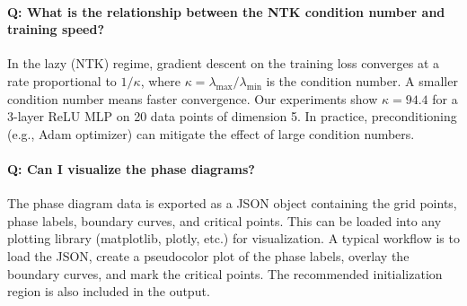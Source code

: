 \documentclass[10pt]{article}
\theoremstyle{definition}
\begin{document}
\paragraph{Q: What is the relationship between the NTK condition number and training speed?}
In the lazy (NTK) regime, gradient descent on the training loss converges at a rate proportional to $1/\kappa$, where $\kappa = \lambda_{\max}/\lambda_{\min}$ is the condition number.
A smaller condition number means faster convergence.
Our experiments show $\kappa = 94.4$ for a 3-layer ReLU MLP on 20 data points of dimension 5.
In practice, preconditioning (e.g., Adam optimizer) can mitigate the effect of large condition numbers.

\paragraph{Q: Can I visualize the phase diagrams?}
The phase diagram data is exported as a JSON object containing the grid points, phase labels, boundary curves, and critical points.
This can be loaded into any plotting library (matplotlib, plotly, etc.) for visualization.
A typical workflow is to load the JSON, create a pseudocolor plot of the phase labels, overlay the boundary curves, and mark the critical points.
The recommended initialization region is also included in the output.
\end{document}
